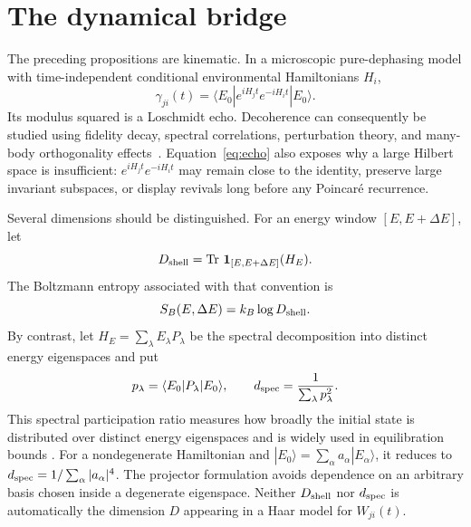 \documentclass[aps,pra,reprint,superscriptaddress,nofootinbib,longbibliography]{revtex4-2}
\newcommand{\bra}[1]{\langle #1 |}
\newcommand{\ket}[1]{| #1 \rangle}
\newcommand{\Tr}{\operatorname{Tr}}
\begin{document}
\section{The dynamical bridge}
\label{sec:dynamics}

The preceding propositions are kinematic.  In a microscopic pure-dephasing
model with time-independent conditional environmental Hamiltonians $H_i$,
\begin{equation}
 \gamma_{ji}(t)
 =\bra{E_0}e^{iH_jt}e^{-iH_it}\ket{E_0}.
 \label{eq:echo}
\end{equation}
Its modulus squared is a Loschmidt echo.  Decoherence can consequently be
studied using fidelity decay, spectral correlations, perturbation theory, and
many-body orthogonality effects~\cite{cucchietti2003echo,gorin2004echo}.
Equation~\eqref{eq:echo} also exposes why a large Hilbert space is insufficient:
$e^{iH_jt}e^{-iH_it}$ may remain close to the identity, preserve large
invariant subspaces, or display revivals long before any Poincar\'e recurrence.

Several dimensions should be distinguished.  For an energy window
$[E,E+\Delta E]$, let
\begin{equation}
 D_{\rm shell}=\Tr\,\mathbf 1_{[E,E+\Delta E]}(H_E).
\end{equation}
The Boltzmann entropy associated with that convention is
\begin{equation}
 S_B(E,\Delta E)=k_B\log D_{\rm shell}.
 \label{eq:boltzmann}
\end{equation}
By contrast, let $H_E=\sum_\lambda E_\lambda P_\lambda$ be the spectral
decomposition into distinct energy eigenspaces and put
\begin{equation}
 p_\lambda=\bra{E_0}P_\lambda\ket{E_0},
 \qquad
 d_{\rm spec}=\frac{1}{\sum_\lambda p_\lambda^2}.
 \label{eq:participation}
\end{equation}
This spectral participation ratio measures how broadly the initial state is
distributed over distinct energy eigenspaces and is widely used in
equilibration bounds
\cite{reimann2008foundation,linden2009quantum,short2011equilibration}.
For a nondegenerate Hamiltonian and
$\ket{E_0}=\sum_\alpha a_\alpha\ket{E_\alpha}$, it reduces to
$d_{\rm spec}=1/\sum_\alpha|a_\alpha|^4$.  The projector formulation avoids
dependence on an arbitrary basis chosen inside a degenerate eigenspace.
Neither $D_{\rm shell}$ nor $d_{\rm spec}$ is automatically the dimension
$D$ appearing in a Haar model for $W_{ji}(t)$.
\end{document}
